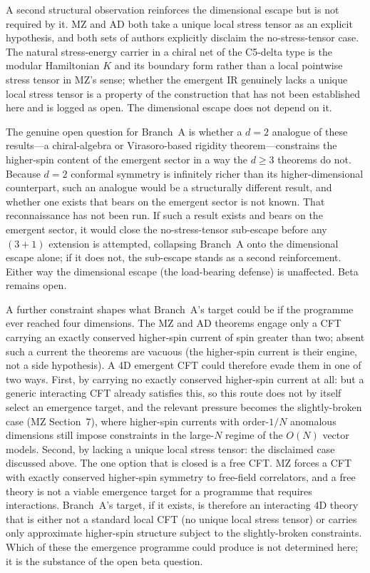 \documentclass[aip,jmp,amsmath,amssymb,reprint,author-year]{revtex4-2}
\begin{document}
A second structural observation reinforces the dimensional escape but is
not required by it.  MZ and AD both take a unique local stress tensor as
an explicit hypothesis, and both sets of authors explicitly disclaim the
no-stress-tensor case.  The natural stress-energy carrier in a chiral net
of the C5-delta type is the modular Hamiltonian $K$ and its boundary form
rather than a local pointwise stress tensor in MZ's sense; whether the
emergent IR genuinely lacks a unique local stress tensor is a property of
the construction that has not been established here and is logged as
open.
The dimensional escape does not depend on it.

The genuine open question for Branch~A is whether a $d = 2$ analogue of
these results---a chiral-algebra or Virasoro-based rigidity theorem---constrains the higher-spin content of the emergent sector in a way the
$d \geq 3$ theorems do not.  Because $d = 2$ conformal symmetry is
infinitely richer than its higher-dimensional counterpart, such an
analogue would be a structurally different result, and whether one exists
that bears on the emergent sector is not known.  That reconnaissance has
not been run.  If such a result exists and bears on the emergent sector,
it would close the no-stress-tensor sub-escape before any $(3{+}1)$
extension is attempted, collapsing Branch~A onto the dimensional escape
alone; if it does not, the sub-escape stands as a second reinforcement.
Either way the dimensional escape (the load-bearing defense) is
unaffected.  Beta remains open.

A further constraint shapes what Branch~A's target could be if the
programme ever reached four dimensions.  The MZ and AD theorems engage
only a CFT carrying an exactly conserved higher-spin current of spin
greater than two; absent such a current the theorems are vacuous (the
higher-spin current is their engine, not a side hypothesis).  A 4D
emergent CFT could therefore evade them in one of two ways.  First, by
carrying no exactly conserved higher-spin current at all: but a generic
interacting CFT already satisfies this, so this route does not by itself
select an emergence target, and the relevant pressure becomes the
slightly-broken case (MZ Section~7), where higher-spin currents with
order-$1/N$ anomalous dimensions still impose constraints in the
large-$N$ regime of the $O(N)$ vector models.  Second, by lacking a
unique local stress tensor: the disclaimed case discussed above.  The one
option that is closed is a free CFT\@.  MZ forces a CFT with exactly
conserved higher-spin symmetry to free-field correlators, and a free
theory is not a viable emergence target for a programme that requires
interactions.  Branch~A's target, if it exists, is therefore an
interacting 4D theory that is either not a standard local CFT (no unique
local stress tensor) or carries only approximate higher-spin structure
subject to the slightly-broken constraints.  Which of these the emergence
programme could produce is not determined here; it is the substance of
the open beta question.
\end{document}
